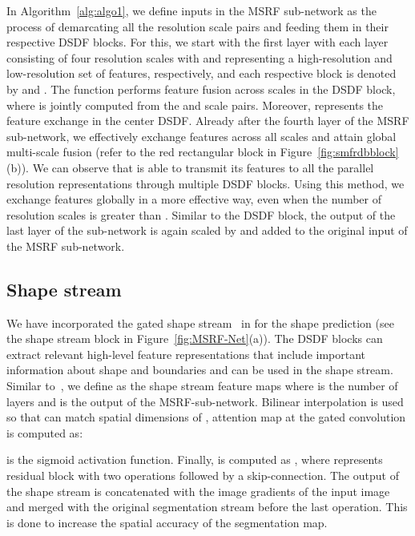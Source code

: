 \documentclass[journal,twoside,web]{IEEEtran}
\newcommand{\sysname}{\text{MSRF-Net}\xspace}
\begin{document}
In Algorithm~\ref{alg:algo1}, we define inputs in the MSRF sub-network as the process of demarcating all the resolution scale pairs and feeding them in their respective \ac{DSDF} blocks. For this, we start with the first layer with each layer consisting of four resolution scales with  and  representing a high-resolution and low-resolution set of features, respectively, and each respective block is denoted by  and . The  function performs feature fusion across scales in the \ac{DSDF} block, where  is jointly computed from the  and  scale pairs. Moreover,  represents the feature exchange in the center \ac{DSDF}. 
Already after the fourth layer of the MSRF sub-network, we effectively exchange features across all scales and attain global multi-scale fusion (refer to the red rectangular block in Figure~\ref{fig:smfrdbblock}(b)). We can observe that  is able to transmit its features to all the parallel resolution representations through multiple \ac{DSDF} blocks. Using this method, we exchange features globally in a more effective way, even when the number of resolution scales is greater than . Similar to the \ac{DSDF} block, the output of the last layer of the sub-network is again scaled by  and added to the original input of the \ac{MSRF} sub-network.
\subsection{Shape stream}
We have incorporated the gated shape stream~\cite{takikawa2019gated} in \sysname for the shape prediction (see the shape stream block in Figure~\ref{fig:MSRF-Net}(a)). The \ac{DSDF} blocks can extract relevant high-level feature representations that include important information about shape and boundaries and can be used in the shape stream.  Similar to~\cite{sun2020saunet}, we define  as the shape stream feature maps where  is the number of layers and  is the output of the \ac{MSRF}-sub-network. Bilinear interpolation is used so that  can match spatial dimensions of , attention map  at the gated convolution is computed as: 

  is the sigmoid activation function. Finally,  is computed as , where  represents residual block with two  operations followed by a skip-connection. The output of the shape stream is concatenated with the image gradients of the input image and merged with the original segmentation stream before the last  operation. This is done to increase the spatial accuracy of the segmentation map.
\end{document}

